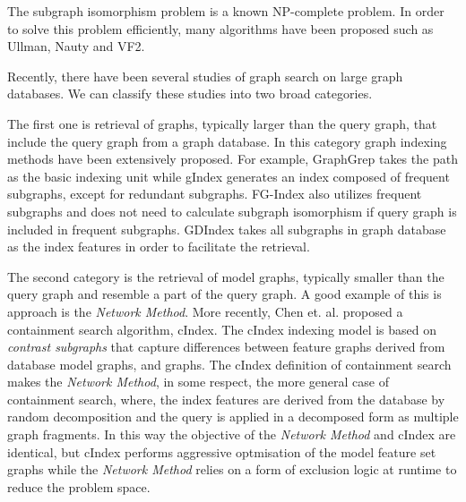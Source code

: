 The subgraph isomorphism problem is a known  NP-complete problem\cite{cook1971_np}.
In order to solve this problem efficiently, many algorithms have been proposed such as Ullman\cite{ullmann1976}, Nauty\cite{mckay1981} and VF2\cite{cordella2001_vf2}.

Recently, there have been several studies of graph search on large graph databases. We can classify these studies into two broad categories.

The first one is retrieval of graphs, typically larger than the query graph, that include the query graph from a graph database. 
In this category graph indexing methods have been extensively proposed. 
For example, GraphGrep\cite{shasha_wang_giugno2002_grapgrep} takes the path as the basic indexing unit while gIndex\cite{yan_yu_han2004_gindex} generates an index composed of frequent subgraphs, except for redundant subgraphs. 
FG-Index\cite{cheng2007_fgindex} also utilizes frequent subgraphs and does not need to calculate subgraph isomorphism if query graph is included in frequent subgraphs.
GDIndex\cite{williams_huan_wang2007_gdindex} takes all subgraphs in graph database as the index features in order to facilitate the retrieval.

The second category is the retrieval of model graphs, typically smaller than the query graph and resemble a part of the query graph. 
A good  example of this is approach is the \textit{Network Method}\cite{messmer_bunke2000}. More recently, Chen et. al. proposed a containment search algorithm, cIndex\cite{chen2007_cindex}. 
The cIndex indexing model is based on  \textit{contrast subgraphs} that capture differences between feature graphs derived from database model graphs, and graphs. 
The cIndex definition of containment search makes the  \textit{Network Method}, in some respect, the more general case of containment search, where, the index features are derived from the database by random decomposition and the query is applied in a decomposed form as multiple graph fragments. 
In this way the objective of the \textit{Network Method} and cIndex are identical, but cIndex performs aggressive optmisation of the model feature set graphs while the \textit{Network Method} relies on a form of  exclusion logic at runtime to reduce the problem space.

